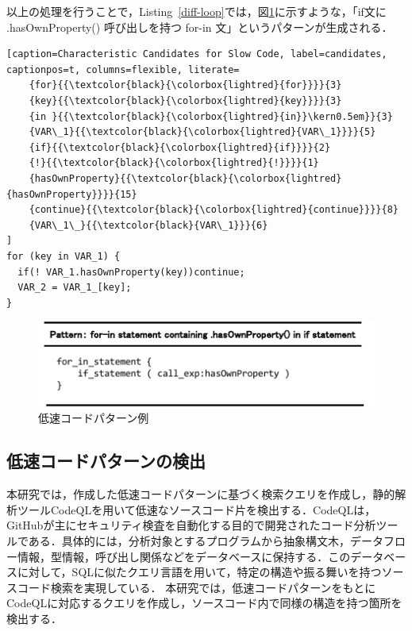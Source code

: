 \documentclass[submit,techrep,noauthor]{ipsj}
\begin{document}
以上の処理を行うことで，Listing~\ref{diff-loop}では，図\ref{fig:slow_pattern}に示すような，「if文に .hasOwnProperty() 呼び出しを持つ for-in 文」というパターンが生成される．

\begin{lstlisting}[caption=Characteristic Candidates for Slow Code, label=candidates, captionpos=t, columns=flexible, literate=
    {for}{{\textcolor{black}{\colorbox{lightred}{for}}}}{3}
    {key}{{\textcolor{black}{\colorbox{lightred}{key}}}}{3}
    {in }{{\textcolor{black}{\colorbox{lightred}{in}}\kern0.5em}}{3}
    {VAR\_1}{{\textcolor{black}{\colorbox{lightred}{VAR\_1}}}}{5}
    {if}{{\textcolor{black}{\colorbox{lightred}{if}}}}{2}
    {!}{{\textcolor{black}{\colorbox{lightred}{!}}}}{1}
    {hasOwnProperty}{{\textcolor{black}{\colorbox{lightred}{hasOwnProperty}}}}{15}
    {continue}{{\textcolor{black}{\colorbox{lightred}{continue}}}}{8}
    {VAR\_1\_}{{\textcolor{black}{VAR\_1}}}{6}
]
for (key in VAR_1) {
  if(! VAR_1.hasOwnProperty(key))continue;
  VAR_2 = VAR_1_[key];
}
\end{lstlisting}

\begin{figure}[!h]
    \centering
    \includegraphics[width=1.0\linewidth]{./Noguchi_fig/slow_pattern.pdf}
    \caption{低速コードパターン例}
    \label{fig:slow_pattern}
\end{figure}



\subsection{低速コードパターンの検出}

本研究では，作成した低速コードパターンに基づく検索クエリを作成し，静的解析ツールCodeQL\cite{ql}を用いて低速なソースコード片を検出する．CodeQLは，GitHubが主にセキュリティ検査を自動化する目的で開発されたコード分析ツールである．具体的には，分析対象とするプログラムから抽象構文木，データフロー情報，型情報，呼び出し関係などをデータベースに保持する．このデータベースに対して，SQLに似たクエリ言語を用いて，特定の構造や振る舞いを持つソースコード検索を実現している．
本研究では，低速コードパターンをもとにCodeQLに対応するクエリを作成し，ソースコード内で同様の構造を持つ箇所を検出する．
\end{document}
